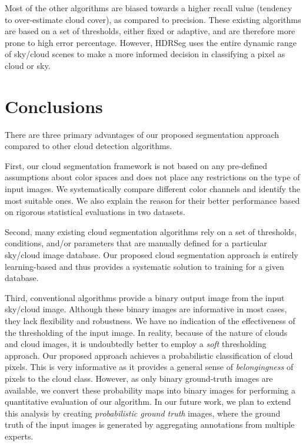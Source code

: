 Most of the other algorithms are biased towards a higher recall value (tendency to over-estimate cloud cover), as compared to precision. These existing algorithms are based on a set of thresholds, either fixed or adaptive, and are therefore more prone to high error percentage. However, HDRSeg uses the entire dynamic range of sky/cloud scenes to make a more informed decision in classifying a pixel as cloud or sky. 


\section{Conclusions}
\label{sec:conc}
There are three primary advantages of our proposed segmentation approach compared to other cloud detection algorithms.

First, our cloud segmentation framework is not based on any pre-defined assumptions about color spaces and does not place any restrictions on the type of input images.  We systematically compare different color channels and identify the most suitable ones. We also explain the reason for their better performance based on rigorous statistical evaluations in two datasets. 

Second, many existing cloud segmentation algorithms rely on a set of thresholds, conditions, and/or parameters that are manually defined for a particular sky/cloud image database. Our proposed cloud segmentation approach is entirely learning-based and thus provides a systematic solution to training for a given database. 

Third, conventional algorithms provide a binary output image from the input sky/cloud image. Although these binary images are informative in most cases, they lack flexibility and robustness. We have no indication of the effectiveness of the thresholding of the input image. In reality, because of the nature of clouds and cloud images, it is undoubtedly better to employ a \emph{soft} thresholding approach. Our proposed approach achieves a probabilistic classification of cloud pixels. This is very informative as it provides a general sense of \emph{belongingness} of pixels to the cloud class. However, as only binary ground-truth images are available, we convert these probability maps into binary images for performing a quantitative evaluation of our algorithm. In our future work, we plan to extend this analysis by creating \emph{probabilistic ground truth} images, where the ground truth of the input images is generated by aggregating  annotations from multiple experts.

